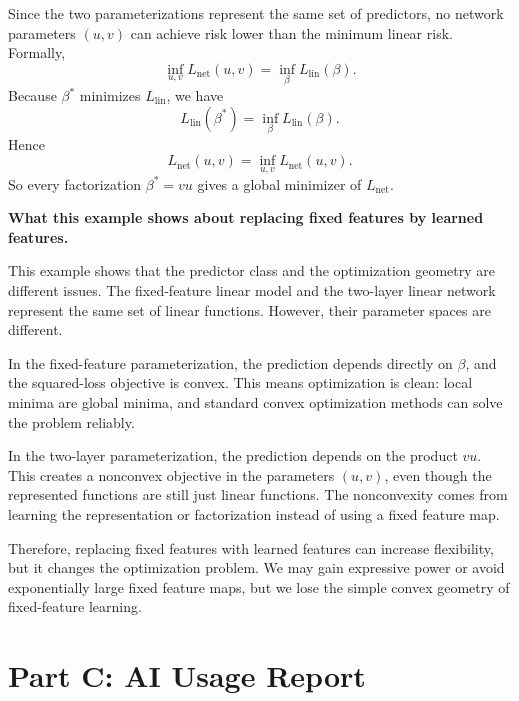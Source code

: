 \documentclass[11pt]{article}
\begin{document}
\begin{enumerate}
\begin{solutionbox}
    Since the two parameterizations represent the same set of predictors, no network parameters
    $(u,v)$ can achieve risk lower than the minimum linear risk. Formally,
    \[
    \inf_{u,v}L_{\mathrm{net}}(u,v)
    =
    \inf_\beta L_{\mathrm{lin}}(\beta).
    \]
    Because $\beta^\ast$ minimizes $L_{\mathrm{lin}}$, we have
    \[
    L_{\mathrm{lin}}(\beta^\ast)
    =
    \inf_\beta L_{\mathrm{lin}}(\beta).
    \]
    Hence
    \[
    L_{\mathrm{net}}(u,v)
    =
    \inf_{u,v}L_{\mathrm{net}}(u,v).
    \]
    So every factorization $\beta^\ast=vu$ gives a global minimizer of $L_{\mathrm{net}}$.

    \medskip

    \textbf{What this example shows about replacing fixed features by learned features.}

    This example shows that the predictor class and the optimization geometry are different
    issues. The fixed-feature linear model and the two-layer linear network represent the same
    set of linear functions. However, their parameter spaces are different.

    In the fixed-feature parameterization, the prediction depends directly on $\beta$, and the
    squared-loss objective is convex. This means optimization is clean: local minima are global
    minima, and standard convex optimization methods can solve the problem reliably.

    In the two-layer parameterization, the prediction depends on the product $vu$. This creates
    a nonconvex objective in the parameters $(u,v)$, even though the represented functions are
    still just linear functions. The nonconvexity comes from learning the representation or
    factorization instead of using a fixed feature map.

    Therefore, replacing fixed features with learned features can increase flexibility, but it
    changes the optimization problem. We may gain expressive power or avoid exponentially large
    fixed feature maps, but we lose the simple convex geometry of fixed-feature learning.

    \end{solutionbox}
\end{enumerate}

\section{Part C: AI Usage Report}
\end{document}
